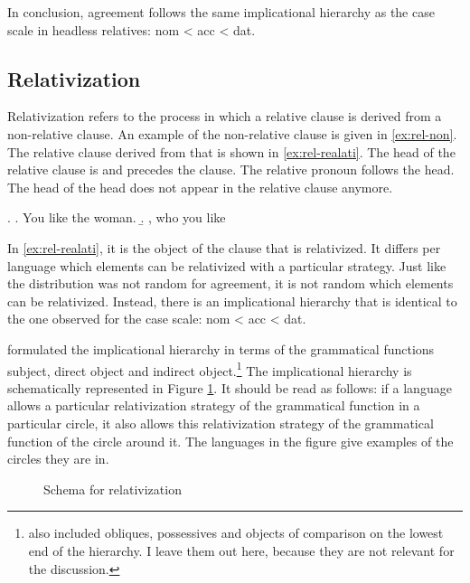 In conclusion, agreement follows the same implicational hierarchy as the case scale in headless relatives: \ac{nom} < \ac{acc} < \ac{dat}.


\subsection{Relativization}

Relativization refers to the process in which a relative clause is derived from a non-relative clause. An example of the non-relative clause is given in \ref{ex:rel-non}. The relative clause derived from that is shown in \ref{ex:rel-realati}. The head of the relative clause is  and precedes the clause. The relative pronoun follows the head. The head of the head does not appear in the relative clause anymore.

\ex.
\a. You like the woman. \label{ex:rel-non}
\b.  , who you like \label{ex:rel-realati}

In \ref{ex:rel-realati}, it is the object of the clause that is relativized. It differs per language which elements can be relativized with a particular strategy. Just like the distribution was not random for agreement, it is not random which elements can be relativized. Instead, there is an implicational hierarchy that is identical to the one observed for the case scale: \ac{nom} < \ac{acc} < \ac{dat}.

\citet{keenan1977} formulated the implicational hierarchy in terms of the grammatical functions subject, direct object and indirect object.\footnote{
\citet{keenan1977} also included obliques, possessives and objects of comparison on the lowest end of the hierarchy. I leave them out here, because they are not relevant for the discussion.
}
The implicational hierarchy is schematically represented in Figure \ref{fig:relativization}. It should be read as follows: if a language allows a particular relativization strategy of the grammatical function in a particular circle, it also allows this relativization strategy of the grammatical function of the circle around it. The languages in the figure give examples of the circles they are in.

\begin{figure}[ht]
  \centering
  \caption{Schema for relativization}
  \label{fig:relativization}
\end{figure}

